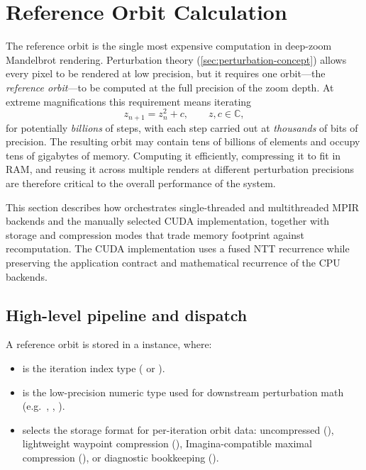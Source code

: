 \section{Reference Orbit Calculation}
\label{sec:ref-orbit-calc}

The reference orbit is the single most expensive computation in
deep-zoom Mandelbrot rendering.  Perturbation theory
(\cref{sec:perturbation-concept}) allows every pixel to be rendered at
low precision, but it requires one orbit---the \emph{reference
orbit}---to be computed at the full precision of the zoom depth.  At
extreme magnifications this requirement means iterating
\begin{equation}
  z_{n+1} = z_n^2 + c,\qquad z,c\in\mathbb{C},
  \label{eq:mandelbrot-recurrence}
\end{equation}
for potentially \emph{billions} of steps, with each step carried out at
\emph{thousands} of bits of precision.  The resulting orbit may contain
tens of billions of elements and occupy tens of gigabytes of memory.
Computing it efficiently, compressing it to fit in RAM, and reusing it
across multiple renders at different perturbation precisions are
therefore critical to the overall performance of the system.

This section describes how  orchestrates single-threaded and
multithreaded MPIR backends and the manually selected CUDA implementation,
together with storage and compression modes that trade memory footprint against
recomputation.  The CUDA implementation uses a fused NTT recurrence while
preserving the application contract and mathematical recurrence of the CPU
backends.

\subsection{High-level pipeline and dispatch}
\label{subsec:ref-orbit-pipeline}

A reference orbit is stored in a 
instance, where:

\begin{itemize}
  \item {} is the iteration index type ( or ).
  \item {} is the low-precision numeric type used for downstream perturbation math (e.g.\ ,
        , ).
  \item {} selects the storage format for per-iteration orbit data:
        uncompressed (), lightweight waypoint compression
        (), Imagina-compatible maximal compression
        (), or diagnostic bookkeeping ().
\end{itemize}

